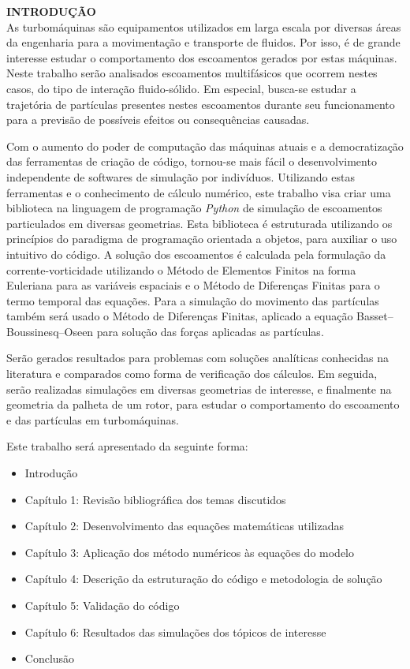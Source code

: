 \noindent\textbf{INTRODUÇÃO}
\\

As turbomáquinas são equipamentos utilizados em larga escala por diversas áreas da engenharia para a movimentação e transporte de fluidos.
Por isso, é de grande interesse estudar o comportamento dos escoamentos gerados por estas máquinas.
Neste trabalho serão analisados escoamentos multifásicos que ocorrem nestes casos, do tipo de interação fluido-sólido.
Em especial, busca-se estudar a trajetória de partículas presentes nestes escoamentos durante seu funcionamento para a previsão de possíveis efeitos ou consequências causadas.

Com o aumento do poder de computação das máquinas atuais e a democratização das ferramentas de criação de código, tornou-se mais fácil o desenvolvimento independente de softwares de simulação por indivíduos.
Utilizando estas ferramentas e o conhecimento de cálculo numérico, este trabalho visa criar uma biblioteca na linguagem de programação \textit{Python} de simulação de escoamentos particulados em diversas geometrias.
Esta biblioteca é estruturada utilizando os princípios do paradigma de programação orientada a objetos, para auxiliar o uso intuitivo do código. 
A solução dos escoamentos é calculada pela formulação da corrente-vorticidade utilizando o Método de Elementos Finitos na forma Euleriana para as variáveis espaciais e o Método de Diferenças Finitas para o termo temporal das equações.
Para a simulação do movimento das partículas também será usado o Método de Diferenças Finitas, aplicado a equação Basset–Boussinesq–Oseen para solução das forças aplicadas as partículas.

Serão gerados resultados para problemas com soluções analíticas conhecidas na literatura e comparados como forma de verificação dos cálculos.
Em seguida, serão realizadas simulações em diversas geometrias de interesse, e finalmente na geometria da palheta de um rotor, para estudar o comportamento do escoamento e das partículas em turbomáquinas.

Este trabalho será apresentado da seguinte forma:
\begin{itemize}
	\item Introdução
	\item Capítulo 1: Revisão bibliográfica dos temas discutidos
	\item Capítulo 2: Desenvolvimento das equações matemáticas utilizadas
	\item Capítulo 3: Aplicação dos método numéricos às equações do modelo
	\item Capítulo 4: Descrição da estruturação do código e metodologia de solução
	\item Capítulo 5: Validação do código
	\item Capítulo 6: Resultados das simulações dos tópicos de interesse
	\item Conclusão
\end{itemize}
